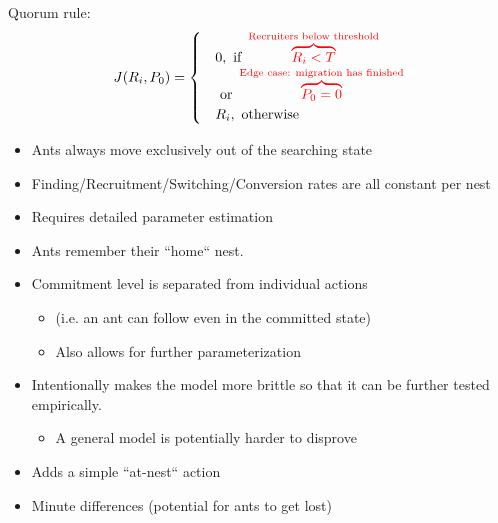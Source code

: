 \documentclass[letterpaper]{article}
\makeatletter
\def\mcolor#1#{\@mcolor{#1}}
\def\@mcolor#1#2#3{%
  \protect\leavevmode
  \begingroup
    \color#1{#2}#3%
  \endgroup
}
\newcommand{\annotate}[3]{
\mcolor{#1}{\overbrace{#3}^\text{#2}}
}
\newcommand{\sitem}[1]
{
    \begin{itemize}
        \item #1
    \end{itemize}
}
\makeatother
\begin{document}
      \Large
      Quorum rule:
      \begin{equation}
          J(R_i, P_0) = 
          \begin{cases}
              & 0,  \text{ if } \annotate{red}{Recruiters below threshold}{R_i < T} \\  
              &     \text{     or } \annotate{red}{Edge case: migration has finished}{P_0 = 0}\\
              & R_i, \text{ otherwise}
          \end{cases}
      \end{equation}

      \begin{itemize}
          \item Ants always move exclusively out of the searching state
          \item Finding/Recruitment/Switching/Conversion rates are all constant per nest
          \item Requires detailed parameter estimation
      \end{itemize}



      \begin{itemize}
          \item Ants remember their ``home`` nest.
          \item Commitment level is separated from individual actions 
              \sitem{(i.e. an ant can follow even in the committed state)}
              \sitem{Also allows for further parameterization}
          \item Intentionally makes the model more brittle so that it can be further tested empirically. 
              \sitem{A general model is potentially harder to disprove}
          \item Adds a simple ``at-nest`` action 
          \item Minute differences (potential for ants to get lost)
      \end{itemize}

      


\footnotesize


\end{document}
